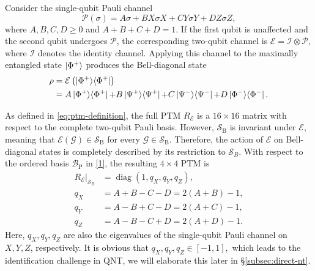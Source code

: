 Consider the single-qubit Pauli channel
\begin{equation}
    \mathcal P(\sigma)
    =
    A\sigma
    +BX\sigma X
    +CY\sigma Y
    +DZ\sigma Z,
    \label{eq:single-qubit-pauli-channel}
\end{equation}
where
\(
A, B, C, D\geq 0
\) and \(
A+B+C+D=1.
\)
If the first qubit is unaffected and the second qubit undergoes
\(\mathcal P\), the corresponding two-qubit channel is
\(
\mathcal E=\mathcal I\otimes\mathcal P,
\)
where \(\mathcal I\) denotes the identity channel.
Applying this channel to the maximally entangled state
\(\ket{\Phi^+}\) produces the Bell-diagonal state
\begin{equation}
    \begin{aligned}
        \rho
         & =
        \mathcal E\left(\ket{\Phi^+}\!\bra{\Phi^+}\right) \\
         & =
        A\ket{\Phi^+}\!\bra{\Phi^+}
                       {+}B\ket{\Psi^+}\!\bra{\Psi^+}
                                         {+}C\ket{\Psi^-}\!\bra{\Psi^-}
                                                           {+}D\ket{\Phi^-}\!\bra{\Phi^-}.
    \end{aligned}
    \label{eq:pauli-channel-output-state}
\end{equation}


As defined in \eqref{eq:ptm-definition}, the full PTM
\(R_{\mathcal E}\) is a \(16\times16\) matrix with respect to the
complete two-qubit Pauli basis. However, $\mathcal S_{\mathrm B}$ is invariant under $\mathcal E$,
meaning that $\mathcal E(\mathcal{G})\in\mathcal S_{\mathrm B}$ for every
$\mathcal{G}\in\mathcal S_{\mathrm B}$. Therefore, the action of \(\mathcal E\) on
Bell-diagonal states is completely described by its restriction to
\(\mathcal S_B\). With respect to the ordered basis
\(\mathcal B_{\mathrm P}\) in \ref{1}, the resulting \(4\times4\) PTM is
\begin{equation}
    \begin{aligned}
        \left.R_{\mathcal E}\right|_{\mathcal S_B}
         & =
        \operatorname{diag}(1,q_X,q_Y,q_Z), \\
        q_X
         & =
        A+B-C-D
        =
        2(A+B)-1,                           \\
        q_Y
         & =
        A-B+C-D
        =
        2(A+C)-1,                           \\
        q_Z
         & =
        A-B-C+D
        =
        2(A+D)-1.
    \end{aligned}
    \label{eq:pauli-channel-ptm}
\end{equation}
Here, \(q_X,q_Y,q_Z\) are also the eigenvalues of the single-qubit
Pauli channel on \(X,Y,Z\), respectively. It is obvious that $q_X,q_Y,q_Z\in [-1,1],
$
which leads to the identification challenge in QNT, we will elaborate this later in \S \ref{subsec:direct-nt}.

